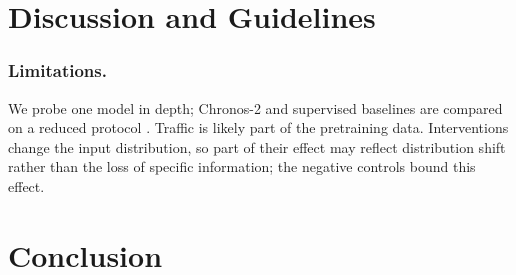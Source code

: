 \documentclass[runningheads]{llncs}
\newif\ifshowtodos
\newcommand{\todo}[1]{\ifshowtodos\textcolor{red}{[TODO: #1]}\fi}
\newcommand{\MV}{\textsc{mv}}
\begin{document}
\section{Discussion and Guidelines}\label{sec:discussion}
\todo{Write after the reruns. Candidate guidelines that the current data
already support: (1) validate the \MV{} mode per dataset before deployment,
since it can lose up to 32\% (Solar-Energy); (2) never pad channel groups with
noise-like or unrelated series, because the model does not ignore them.
Mode-selection thresholds and channel-budget rules require E5 and E7.}

\subsubsection{Limitations.}
We probe one model in depth; Chronos-2 and supervised baselines are compared
on a reduced protocol \todo{E4}. Traffic is likely part of the pretraining
data. Interventions change the input distribution, so part of their effect may
reflect distribution shift rather than the loss of specific information; the
negative controls bound this effect.

\section{Conclusion}\label{sec:conclusion}
\todo{Write last.}



\end{document}

